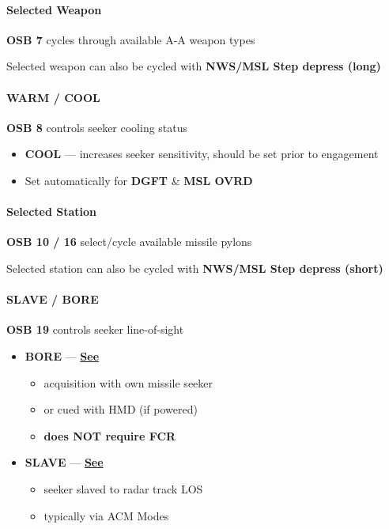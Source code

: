 \paragraph{Selected Weapon}
\textbf{OSB 7} cycles through available A-A weapon types

\medskip
Selected weapon can also be cycled with \textbf{NWS/MSL Step depress (long)}

\paragraph{WARM / COOL}
\textbf{OSB 8} controls seeker cooling status

\begin{itemize}
    \item \textbf{COOL} ---  increases seeker sensitivity, should be set prior to engagement
    \item Set automatically for \textbf{DGFT} \& \textbf{MSL OVRD}
\end{itemize}

\paragraph{Selected Station}
\textbf{OSB 10 / 16} select/cycle available missile pylons

\medskip
Selected station can also be cycled with \textbf{NWS/MSL Step depress (short)}

\clearpage

\paragraph{SLAVE / BORE}
\textbf{OSB 19} controls seeker line-of-sight

\begin{itemize}
    \item \textbf{BORE} --- \hyperref[subsec:aim9:bore]{\textbf{See }}
    \begin{itemize}
        \item acquisition with own missile seeker
        \item or cued with HMD (if powered)
        \item \textbf{does NOT require FCR}
    \end{itemize}
    \item \textbf{SLAVE} --- \hyperref[subsec:aim9:slave]{\textbf{See }}
    \begin{itemize}
        \item seeker slaved to radar track LOS
        \item typically via ACM Modes
    \end{itemize}
\end{itemize}


